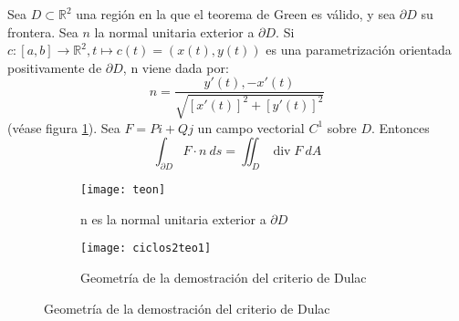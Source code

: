 \begin{tcolorbox}[colback=Black!4, colframe=White, arc=2mm]
\begin{recordatorio}
  Sea $D \subset \mathbb{R}^2$ una región en la que el teorema de Green es válido, y sea $\partial D$ su frontera. Sea  $n$ la normal unitaria exterior a  $\partial D$. Si  $c:[a,b] \to \mathbb{R}^2, t \mapsto c(t)=(x(t),y(t))$ es una parametrización orientada positivamente de $\partial D$, n viene dada por:  $$
  n = \frac{y'(t), -x'(t)}{\sqrt{[x'(t)]^2+[y'(t)]^2}}
  $$
  (véase figura \ref{teon}). Sea $F = Pi + Qj$ un campo vectorial  $C^{1}$ sobre $D$. Entonces  $$
  \int_{{\partial D}}^{{}} {F \cdot n} \: d{s} = \iint_{{D}}^{{}} {\operatorname{div}F} \: d{A}
  $$
\end{recordatorio}
\end{tcolorbox}


\begin{figure}[htpb]
  \begin{subfigure}[b]{0.49\textwidth}
    \texttt{[image: teon]}
    \caption{n es la normal unitaria exterior a $\partial D$}
    \label{teon}
  \end{subfigure}
  \hfill
  \begin{subfigure}[b]{0.49\textwidth}
    \texttt{[image: ciclos2teo1]}
    \caption{Geometría de la demostración del criterio de Dulac}
  \end{subfigure}
\end{figure}

